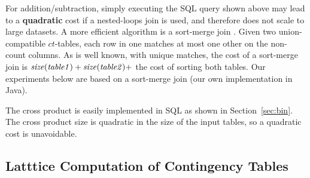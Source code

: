 \documentclass{vldb}
\newcommand{\ct}{\mathit{ct}}
\begin{document}
For addition/subtraction, simply executing the SQL query shown above %
may lead to a \textbf{quadratic} cost if a nested-loops join is used, and therefore does not scale to large datasets.
A more efficient algorithm is a sort-merge join \cite{Ullman1982}. 
Given two union-compatible $\ct$-tables, each row in one matches at most one other on the non-count columns. 
As is well known, with unique matches, the cost of a sort-merge join is $\it{size}(table1) + \it{size}(table2) +$ the cost of sorting both tables. 
Our experiments below are based on a sort-merge join (our own implementation in Java). 

The cross product is easily implemented in SQL as shown in Section~\ref{sec:bin}. The cross product size is quadratic in the size of the input tables, so a quadratic cost is unavoidable.





\subsection{Latttice Computation of Contingency Tables} \label{sec:mobius}
\end{document}
